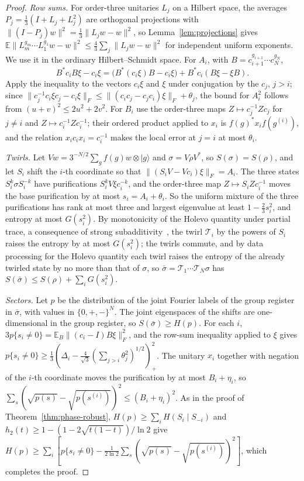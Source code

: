 \documentclass[11pt,a4paper]{article}
\theoremstyle{plain}
\theoremstyle{definition}
\theoremstyle{remark}
\begin{document}
\begin{proof}
\emph{Row sums.} For order-three unitaries $L_j$ on a Hilbert space, the averages $P_j=\frac13(I+L_j+L_j^2)$ are orthogonal projections
with $\|(I-P_j)w\|^2=\frac13\|L_jw-w\|^2$, so Lemma~\ref{lem:projections} gives
$\mathbb E\|L_m^{g_m}\cdots L_1^{g_1}w-w\|^2\le\frac43\sum_j\|L_jw-w\|^2$ for independent uniform exponents. We use it in the ordinary
Hilbert--Schmidt space. For $A_i$, with $B=c_{i+1}^{g_{i+1}}\cdots c_N^{g_N}$,
\[
B^*c_iB\xi-c_i\xi=\big(B^*(c_i\xi)B-c_i\xi\big)+B^*c_i(B\xi-\xi B).
\]
Apply the inequality to the vectors $c_i\xi$ and $\xi$ under conjugation by the $c_j$, $j>i$; since
$\|c_j^{-1}c_i\xi c_j-c_i\xi\|_F\le\|(c_ic_j-c_jc_i)\xi\|_F+\theta_j$, the bound for $A_i^2$ follows from $(u+v)^2\le2u^2+2v^2$. For $B_i$ use the
order-three maps $Z\mapsto c_j^{-1}Zc_j$ for $j\ne i$ and $Z\mapsto c_i^{-1}Zc_i^{-1}$; their ordered product applied to $x_i$ is
$f(g)^*x_if(g^{(i)})$, and the relation $x_ic_ix_i=c_i^{-1}$ makes the local error at $j=i$ at most $\theta_i$.

\emph{Twirls.} Let $Vw=3^{-N/2}\sum_gf(g)w\otimes|g\rangle$ and $\sigma=V\rho V^*$, so $S(\sigma)=S(\rho)$, and let $S_i$ shift the $i$-th
coordinate so that $\|(S_iV-Vc_i)\xi\|_F=A_i$. The three states $S_i^k\sigma S_i^{-k}$ have purifications $S_i^kV\xi c_i^{-k}$, and the
order-three map $Z\mapsto S_iZc_i^{-1}$ moves the base purification by at most $s_i=A_i+\theta_i$. So the uniform mixture of the three
purifications has rank at most three and largest eigenvalue at least $1-\frac23s_i^2$, and entropy at most $G(s_i^2)$. By
monotonicity of the Holevo quantity under partial trace, a consequence of strong subadditivity~\cite{LiebRuskai1973}, the twirl
$\mathcal T_i$ by the powers of $S_i$ raises the entropy by at most $G(s_i^2)$; the twirls commute, and by data processing for the Holevo
quantity each twirl raises the entropy of the already twirled state by no more than that of $\sigma$, so
$\bar\sigma=\mathcal T_1\cdots\mathcal T_N\sigma$ has $S(\bar\sigma)\le S(\rho)+\sum_iG(s_i^2)$.

\emph{Sectors.} Let $p$ be the distribution of the joint Fourier labels of the group register in $\bar\sigma$, with values in
$\{0,+,-\}^N$. The joint eigenspaces of the shifts are one-dimensional in the group register, so $S(\bar\sigma)\ge H(p)$. For each $i$,
$3p\{s_i\ne0\}=\mathbb E_B\|(c_i-I)B\xi\|_F^2$, and the row-sum inequality applied to $\xi$ gives
$p\{s_i\ne0\}\ge\frac13(\Delta_i-\frac4{\sqrt3}(\sum_{j>i}\theta_j^2)^{1/2})_+^2$. The unitary $x_i$ together with negation of the $i$-th coordinate
moves the purification by at most $B_i+\eta_i$, so $\sum_s(\sqrt{p(s)}-\sqrt{p(s^{(i)})})^2\le(B_i+\eta_i)^2$. As in the proof of
Theorem~\ref{thm:phase-robust}, $H(p)\ge\sum_iH(S_i\mid S_{-i})$ and $h_2(t)\ge1-(1-2\sqrt{t(1-t)})/\ln2$ give
$H(p)\ge\sum_i[p\{s_i\ne0\}-\frac1{2\ln2}\sum_s(\sqrt{p(s)}-\sqrt{p(s^{(i)})})^2]$, which completes the proof.
\end{proof}
\end{document}
